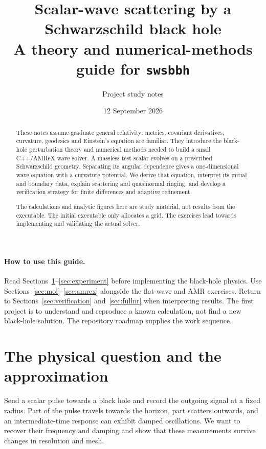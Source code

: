 \documentclass[11pt,a4paper]{article}
\title{Scalar-wave scattering by a Schwarzschild black hole\\
 \large A theory and numerical-methods guide for \texttt{swsbbh}}
\author{Project study notes}
\date{12 September 2026}
\numberwithin{equation}{section}
\begin{document}
\maketitle

\begin{abstract}
These notes assume graduate general relativity: metrics, covariant derivatives,
curvature, geodesics and Einstein's equation are familiar. They introduce the
black-hole perturbation theory and numerical methods needed to build a small
C++/AMReX wave solver. A massless test scalar evolves on a prescribed
Schwarzschild geometry. Separating its angular dependence gives a
one-dimensional wave equation with a curvature potential. We derive that
equation, interpret its initial and boundary data, explain scattering and
quasinormal ringing, and develop a verification strategy for finite
differences and adaptive refinement.

The calculations and analytic figures here are study material, not results
from the executable. The initial executable only allocates a grid. The
exercises lead towards implementing and validating the actual solver.
\end{abstract}

\paragraph{How to use this guide.}
Read Sections~\ref{sec:scope}--\ref{sec:experiment} before implementing the
black-hole physics. Use Sections~\ref{sec:mol}--\ref{sec:amrex} alongside the
flat-wave and AMR exercises. Return to Sections~\ref{sec:verification}
and~\ref{sec:fullnr} when interpreting results. The first project is to
understand and reproduce a known calculation, not find a new black-hole
solution. The repository roadmap supplies the work sequence.

\tableofcontents
\newpage

\section{The physical question and the approximation}\label{sec:scope}

Send a scalar pulse towards a black hole and record the outgoing signal at a
fixed radius. Part of the pulse travels towards the horizon, part scatters
outwards, and an intermediate-time response can exhibit damped oscillations.
We want to recover their frequency and damping and show that these
measurements survive changes in resolution and mesh.
\end{document}
